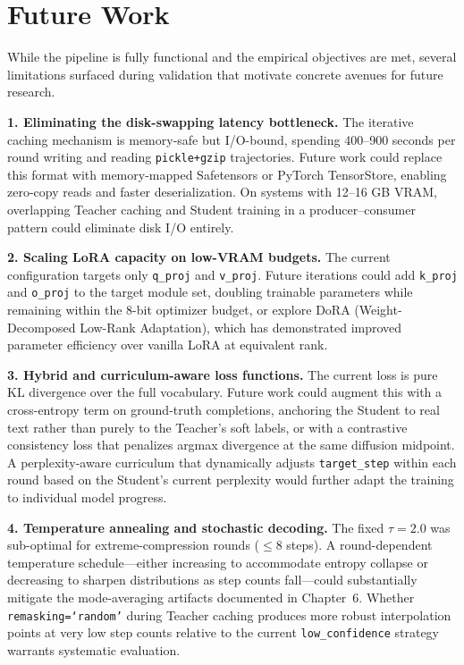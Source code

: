 \documentclass[11pt, a4paper]{article}
\begin{document}
\section{Future Work}
\label{sec:future_work}

While the pipeline is fully functional and the empirical objectives are met, several limitations surfaced during validation that motivate concrete avenues for future research.

\textbf{1. Eliminating the disk-swapping latency bottleneck.} The iterative caching mechanism is memory-safe but I/O-bound, spending 400--900 seconds per round writing and reading \texttt{pickle+gzip} trajectories. Future work could replace this format with memory-mapped Safetensors or PyTorch TensorStore, enabling zero-copy reads and faster deserialization. On systems with 12--16 GB VRAM, overlapping Teacher caching and Student training in a producer--consumer pattern could eliminate disk I/O entirely.

\textbf{2. Scaling LoRA capacity on low-VRAM budgets.} The current configuration targets only \texttt{q\_proj} and \texttt{v\_proj}. Future iterations could add \texttt{k\_proj} and \texttt{o\_proj} to the target module set, doubling trainable parameters while remaining within the 8-bit optimizer budget, or explore DoRA (Weight-Decomposed Low-Rank Adaptation), which has demonstrated improved parameter efficiency over vanilla LoRA at equivalent rank.

\textbf{3. Hybrid and curriculum-aware loss functions.} The current loss is pure KL divergence over the full vocabulary. Future work could augment this with a cross-entropy term on ground-truth completions, anchoring the Student to real text rather than purely to the Teacher's soft labels, or with a contrastive consistency loss that penalizes argmax divergence at the same diffusion midpoint. A perplexity-aware curriculum that dynamically adjusts \texttt{target\_step} within each round based on the Student's current perplexity would further adapt the training to individual model progress.

\textbf{4. Temperature annealing and stochastic decoding.} The fixed $\tau = 2.0$ was sub-optimal for extreme-compression rounds ($\leq$8 steps). A round-dependent temperature schedule---either increasing to accommodate entropy collapse or decreasing to sharpen distributions as step counts fall---could substantially mitigate the mode-averaging artifacts documented in Chapter~6. Whether \texttt{remasking=`random'} during Teacher caching produces more robust interpolation points at very low step counts relative to the current \texttt{low\_confidence} strategy warrants systematic evaluation.
\end{document}
